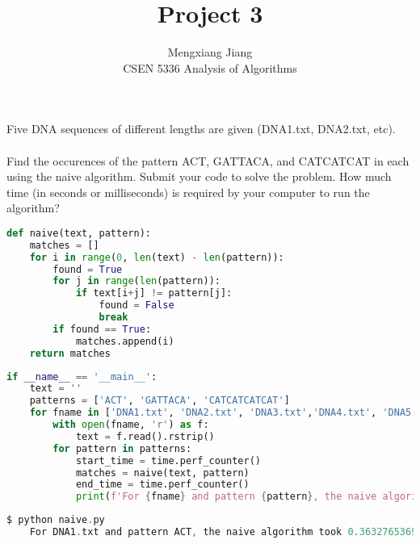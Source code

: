 \documentclass[12pt]{article}
\newenvironment{problem}[2][Problem]{\begin{trivlist}
\item[\hskip \labelsep {\bfseries #1}\hskip \labelsep {\bfseries #2.}]}{\end{trivlist}}
\begin{document}
 
 
\title{Project 3}%
\author{Mengxiang Jiang\\ %
CSEN 5336 Analysis of Algorithms} %
 
\maketitle
 
\begin{problem}{1} %
Five DNA sequences of different lengths are given (DNA1.txt, DNA2.txt, etc).\\\\
Find the occurences of the pattern ACT, GATTACA, and CATCATCAT in each using the naive algorithm. Submit your code to solve the problem.
How much time (in seconds or milliseconds) is required by your computer to run the
algorithm?
\begin{lstlisting}[language=Python, caption=naive algorithm]
def naive(text, pattern):
    matches = []
    for i in range(0, len(text) - len(pattern)):
        found = True
        for j in range(len(pattern)):
            if text[i+j] != pattern[j]:
                found = False
                break
        if found == True:
            matches.append(i)
    return matches
\end{lstlisting}
\begin{lstlisting}[language=Python, caption=main function code]
if __name__ == '__main__':
    text = ''
    patterns = ['ACT', 'GATTACA', 'CATCATCATCAT']
    for fname in ['DNA1.txt', 'DNA2.txt', 'DNA3.txt','DNA4.txt', 'DNA5.txt']:
        with open(fname, 'r') as f:
            text = f.read().rstrip()
        for pattern in patterns:
            start_time = time.perf_counter()
            matches = naive(text, pattern)
            end_time = time.perf_counter()
            print(f'For {fname} and pattern {pattern}, the naive algorithm took {end_time-start_time} seconds with {len(matches)} matches')
\end{lstlisting}
\pagebreak
\begin{lstlisting}[language=C, caption=Terminal output running code]
$ python naive.py
    For DNA1.txt and pattern ACT, the naive algorithm took 0.3632765369984554 seconds with 65495 matches

\end{lstlisting}
\end{problem}
\end{document}
